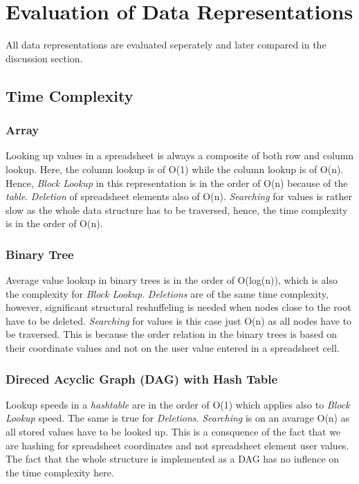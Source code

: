 \documentclass[a4paper,11pt,twoside]{article}
\begin{document}
\section{Evaluation of Data Representations}
All data representations are evaluated seperately and later compared
in the discussion section.
\subsection{Time Complexity}
\subsubsection{Array}
Looking up values in a spreadsheet is always a composite of both row
and column lookup. Here, the column lookup is of O(1) while the column
lookup is of O(n). Hence, \emph{Block Lookup} in this representation
is in the order of O(n) because of the \textit{table}. \emph{Deletion}
of spreadsheet elements also of O(n). \emph{Searching} for values is
rather slow as the whole data structure has to be traversed, hence,
the time complexity is in the order of O(n).

\subsubsection{Binary Tree}
Average value lookup in binary trees is in the order of O(log(n)),
which is also the complexity for \emph{Block Lookup}. \emph{Deletions}
are of the same time complexity, however, significant structural
reshuffeling is needed when nodes close to the root have to be
deleted. \emph{Searching} for values is this case just O(n) as all
nodes have to be traversed. This is because the order relation in the
binary trees is based on their coordinate values and not on the user
value entered in a spreadsheet cell.

\subsubsection{Direced Acyclic Graph (DAG) with Hash Table}
Lookup speeds in a \textit{hashtable} are in the order of O(1) which
applies also to \emph{Block Lookup} speed. The same is true for
\emph{Deletions}. \emph{Searching} is on an avarage O(n) as all stored values
have to be looked up. This is a consquence of the fact that we are
hashing for spreadsheet coordinates and not spreadsheet element user
values. The fact that the whole structure is implemented as a DAG has
no inflence on the time complexity here. 
\end{document}
